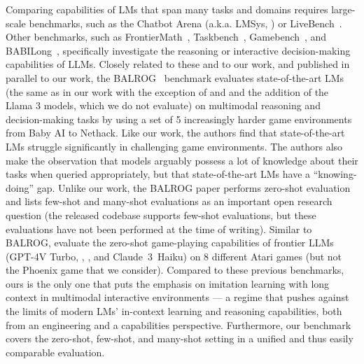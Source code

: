 Comparing capabilities of LMs that span many tasks and domains requires large-scale benchmarks, such as the Chatbot Arena (a.k.a. LMSys, \citet{chiang2024chatbot}) or LiveBench~\citep{white2025livebench}.
Other benchmarks, such as FrontierMath~\citep{glazer2024frontiermath}, Taskbench~\citep{shen2024taskbench}, Gamebench~\citep{costarelli2024gamebench}, and BABILong~\citep{kuratov2024babilong}, specifically investigate the reasoning or interactive decision-making capabilities of LLMs.
Closely related to these and to our work, and published in parallel to our work, the BALROG~\citep{paglieri2025balrog} benchmark evaluates state-of-the-art LMs (the same as in our work with the exception of \mini{} and \preview{} and the addition of the Llama 3 models, which we do not evaluate) on multimodal reasoning and decision-making tasks by using a set of 5 increasingly harder game environments from Baby AI to Nethack.
Like our work, the authors find that state-of-the-art LMs struggle significantly in challenging game environments.
The authors also make the observation that models arguably possess a lot of knowledge about their tasks when queried appropriately, but that state-of-the-art LMs have a ``knowing-doing'' gap.
Unlike our work, the BALROG paper performs zero-shot evaluation and lists few-shot and many-shot evaluations as an important open research question (the released codebase supports few-shot evaluations, but these evaluations have not been performed at the time of writing).
Similar to BALROG, \citet{waytowich2024atari} evaluate the zero-shot game-playing capabilities of frontier LLMs (GPT-4V Turbo, \gpt, \flash{}, and Claude~$3$~Haiku) on $8$ different Atari games (but not the Phoenix game that we consider).
Compared to these previous benchmarks, ours is the only one that puts the emphasis on imitation learning with long context in multimodal interactive environments --- a regime that pushes against the limits of modern LMs' in-context learning and reasoning capabilities, both from an engineering and a capabilities perspective.
Furthermore, our benchmark covers the zero-shot, few-shot, and many-shot setting in a unified and thus easily comparable evaluation.

